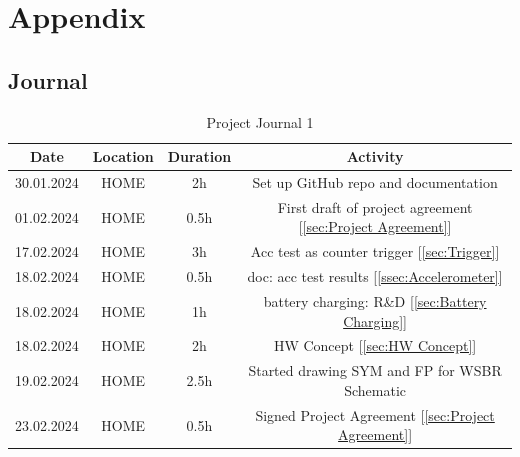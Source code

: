 \chapter{Appendix}
\label{cha:Appendix}

\section{Journal}
\label{sec:Journal}

\begin{table}[H]
    \centering
    
\begin{tabular}{||c | c | c || c||} 
 \hline
 Date &  Location & Duration & Activity \\ [0.5ex] 
 \hline\hline
    30.01.2024 & HOME & 2h & Set up GitHub repo and documentation \\   
 \hline
    01.02.2024 & HOME & 0.5h & First draft of project agreement [\ref{sec:Project Agreement}] \\ 
 \hline
    17.02.2024 & HOME & 3h & Acc test as counter trigger [\ref{sec:Trigger}] \\ 
 \hline
    18.02.2024 & HOME & 0.5h & doc: acc test results [\ref{ssec:Accelerometer}] \\ 
 \hline
    18.02.2024 & HOME & 1h & battery charging: R\&D [\ref{sec:Battery Charging}] \\ 
 \hline
    18.02.2024 & HOME & 2h & HW Concept [\ref{sec:HW Concept}] \\ 
 \hline
    19.02.2024 & HOME & 2.5h & Started drawing SYM and FP for WSBR Schematic \\ 
 \hline
    23.02.2024 & HOME & 0.5h & Signed Project Agreement [\ref{sec:Project Agreement}] \\ 
 \hline


\end{tabular}
    \caption{Project Journal 1}
    \label{tab:Project Journal 1}
\end{table}

\newpage


